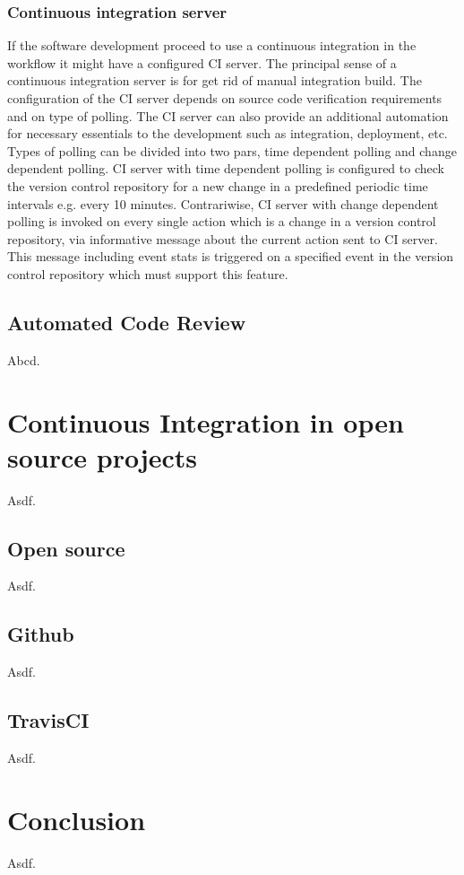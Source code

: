 \subsection{Continuous integration server}

If the software development proceed to use a continuous integration in the workflow it might have a configured CI server. The principal sense of a continuous integration server is for get rid of manual integration build. The configuration of the CI server depends on source code verification requirements and on type of polling. The CI server can also provide an additional automation for necessary essentials to the development such as integration, deployment, etc.\\

Types of polling can be divided into two pars, time dependent polling and change dependent polling. CI server with time dependent polling is configured to check the version control repository for a new change in a predefined periodic time intervals e.g. every 10 minutes. Contrariwise, CI server with change dependent polling is invoked on every single action which is a change in a version control repository, via informative message about the current action sent to CI server. This message including event stats is triggered on a specified event in the version control repository which must support this feature.

\section{Automated Code Review}
Abcd.

\chapter{Continuous Integration in open source projects}
Asdf.

\section{Open source}
Asdf.

\section{Github}
Asdf.

\section{TravisCI}
Asdf.

\chapter{Conclusion}
Asdf.

